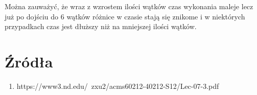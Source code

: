 \documentclass[11pt]{article}
\begin{document}
    Można zauważyć, że wraz z wzrostem ilości wątków czas wykonania maleje lecz już po dojściu do 6 wątków różnice w czasie
    stają się znikome i w niektórych przypadkach czas jest dłuższy niż na mniejszej ilości wątków.

    \clearpage

    \section{Źródła}
    \begin{enumerate}
        \item https://www3.nd.edu/~zxu2/acms60212-40212-S12/Lec-07-3.pdf
    \end{enumerate}
\end{document}
